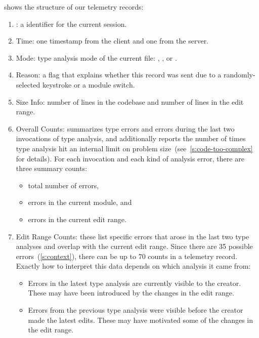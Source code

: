 \documentclass[english,submission,cleveref]{programming}
\begin{document}
 shows the structure of our telemetry records:
\begin{enumerate}
  \item
    \uid{}: a \panon{} identifier for the current session.
  \item
    Time: one timestamp from the client and one from the server.
  \item
    Mode: type analysis mode of the current file: \mnocheck{},
    \mnonstrict{}, or \mstrict{}.
  \item
    Reason: a flag that explains whether this record was sent due to a
    randomly-selected keystroke or a module switch.
  \item
    Size Info: number of lines in the codebase and number of lines in the edit range.
  \item
    Overall Counts: summarizes type errors and \FS{} errors during the
    last two invocations of type analysis, and additionally reports the number
    of times type analysis hit an internal limit on problem
    size~(see~\cref{s:code-too-complex} for details).
    For each invocation and each kind of
    analysis error, there are three summary counts:
    \begin{itemize}
      \item total number of errors,
      \item errors in the current module, and
      \item errors in the current edit range.
    \end{itemize}
  \item
    Edit Range Counts: these list specific errors that arose in the last two
    type analyses and overlap with the current edit range.
    Since there are 35 possible errors~(\cref{s:context}), there can be up to 70 counts
    in a telemetry record.
    Exactly how to interpret this data depends on which analysis it came from:
    \begin{itemize}
      \item
        Errors in the latest type analysis are currently visible to the
        creator.
        These may have been introduced by the changes in the edit range.
      \item
        Errors from the previous type analysis were visible before the creator
        made the latest edits.
        These may have motivated some of the changes in the edit range.
    \end{itemize}
\end{enumerate}
\end{document}
